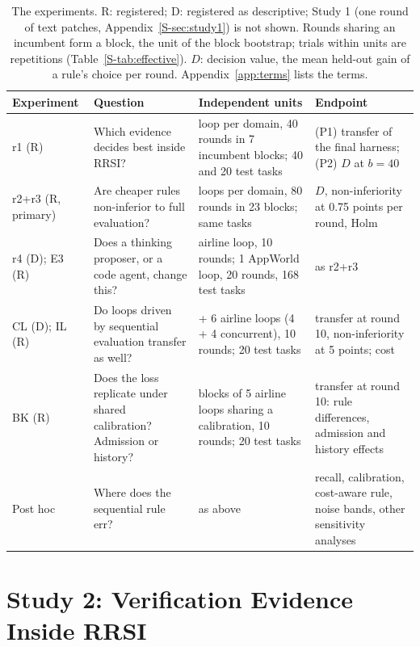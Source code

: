 \documentclass[11pt]{article}
\begin{document}
\begin{table}[t]
\centering\footnotesize
\setlength{\tabcolsep}{3pt}
\begin{tabular}{@{}>{\raggedright\arraybackslash}p{1.95cm}>{\raggedright\arraybackslash}p{4.3cm}>{\raggedright\arraybackslash}p{4.5cm}>{\raggedright\arraybackslash}p{4.55cm}@{}}
\toprule
Experiment & Question & Independent units & Endpoint \\
\midrule
r1 (R) & Which evidence decides best inside RRSI? & 1 loop per domain, 40 rounds in 7 incumbent blocks; 40 and 20 test tasks & (P1) transfer of the final harness; (P2) $D$ at $b=40$ \\
r2+r3 (R, primary) & Are cheaper rules non-inferior to full evaluation? & 2 loops per domain, 80 rounds in 23 blocks; same tasks & $D$, non-inferiority at 0.75 points per round, Holm \\
r4 (D); E3 (R) & Does a thinking proposer, or a code agent, change this? & 1 airline loop, 10 rounds; 1 AppWorld loop, 20 rounds, 168 test tasks & as r2+r3 \\
CL (D); IL (R) & Do loops driven by sequential evaluation transfer as well? & 6 + 6 airline loops (4 + 4 concurrent), 10 rounds; 20 test tasks & transfer at round 10, non-inferiority at 5 points; cost \\
BK (R) & Does the loss replicate under shared calibration? Admission or history? & 4 blocks of 5 airline loops sharing a calibration, 10 rounds; 20 test tasks & transfer at round 10: rule differences, admission and history effects \\
Post hoc & Where does the sequential rule err? & as above & recall, calibration, cost-aware rule, noise bands, other sensitivity analyses \\
\bottomrule
\end{tabular}
\caption{The experiments. R: registered; D: registered as descriptive; Study 1 (one round of text patches, Appendix~\ref*{S-sec:study1}) is not shown. Rounds sharing an incumbent form a block, the unit of the block bootstrap; trials within units are repetitions (Table~\ref*{S-tab:effective}). $D$: decision value, the mean held-out gain of a rule's choice per round. Appendix~\ref{app:terms} lists the terms.}
\label{tab:overview}
\end{table}

\section{Study 2: Verification Evidence Inside RRSI}
\label{sec:study2}
\end{document}

